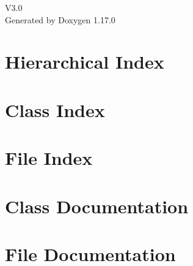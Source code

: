 \documentclass[twoside]{book}
\newcommand{\+}{\discretionary{\mbox{\scriptsize$\hookleftarrow$}}{}{}}
\newcommand{\clearemptydoublepage}{%
    \newpage{\pagestyle{empty}\cleardoublepage}%
  }
\begin{document}
  \raggedbottom
    \hypersetup{pageanchor=false,
                bookmarksnumbered=true,
                pdfencoding=unicode
               }
  \begin{titlepage}
  \vspace*{7cm}
  \begin{center}%
  {\Large V3.\+0}\\
  \vspace*{1cm}
  {\large Generated by Doxygen 1.17.0}\\
  \end{center}
  \end{titlepage}
  \clearemptydoublepage
  \tableofcontents
  \clearemptydoublepage
  \hypersetup{pageanchor=true}

\chapter{Hierarchical Index}

\chapter{Class Index}

\chapter{File Index}

\chapter{Class Documentation}



\chapter{File Documentation}













  \backmatter
  \newpage
  \clearemptydoublepage
  \printindex
\end{document}

